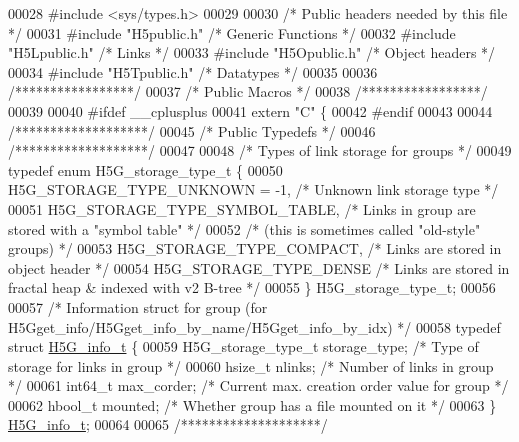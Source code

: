 \begin{DoxyCode}
00028 \textcolor{preprocessor}{#include <sys/types.h>}
00029 
00030 \textcolor{comment}{/* Public headers needed by this file */}
00031 \textcolor{preprocessor}{#include "H5public.h"}       \textcolor{comment}{/* Generic Functions            */}
00032 \textcolor{preprocessor}{#include "H5Lpublic.h"}      \textcolor{comment}{/* Links                                */}
00033 \textcolor{preprocessor}{#include "H5Opublic.h"}      \textcolor{comment}{/* Object headers           */}
00034 \textcolor{preprocessor}{#include "H5Tpublic.h"}      \textcolor{comment}{/* Datatypes                */}
00035 
00036 \textcolor{comment}{/*****************/}
00037 \textcolor{comment}{/* Public Macros */}
00038 \textcolor{comment}{/*****************/}
00039 
00040 \textcolor{preprocessor}{#ifdef \_\_cplusplus}
00041 \textcolor{keyword}{extern} \textcolor{stringliteral}{"C"} \{
00042 \textcolor{preprocessor}{#endif}
00043 
00044 \textcolor{comment}{/*******************/}
00045 \textcolor{comment}{/* Public Typedefs */}
00046 \textcolor{comment}{/*******************/}
00047 
00048 \textcolor{comment}{/* Types of link storage for groups */}
00049 \textcolor{keyword}{typedef} \textcolor{keyword}{enum} H5G\_storage\_type\_t \{
00050     H5G\_STORAGE\_TYPE\_UNKNOWN = -1,  \textcolor{comment}{/* Unknown link storage type    */}
00051     H5G\_STORAGE\_TYPE\_SYMBOL\_TABLE,      \textcolor{comment}{/* Links in group are stored with a "symbol table" */}
00052                                         \textcolor{comment}{/* (this is sometimes called "old-style" groups) */}
00053     H5G\_STORAGE\_TYPE\_COMPACT,       \textcolor{comment}{/* Links are stored in object header */}
00054     H5G\_STORAGE\_TYPE\_DENSE      \textcolor{comment}{/* Links are stored in fractal heap & indexed with v2 B-tree */}
00055 \} H5G\_storage\_type\_t;
00056 
00057 \textcolor{comment}{/* Information struct for group (for H5Gget\_info/H5Gget\_info\_by\_name/H5Gget\_info\_by\_idx) */}
00058 \textcolor{keyword}{typedef} \textcolor{keyword}{struct }\hyperlink{struct_h5_g__info__t}{H5G\_info\_t} \{
00059     H5G\_storage\_type\_t  storage\_type;   \textcolor{comment}{/* Type of storage for links in group */}
00060     hsize\_t     nlinks;             \textcolor{comment}{/* Number of links in group */}
00061     int64\_t     max\_corder;             \textcolor{comment}{/* Current max. creation order value for group */}
00062     hbool\_t     mounted;                \textcolor{comment}{/* Whether group has a file mounted on it */}
00063 \} \hyperlink{struct_h5_g__info__t}{H5G\_info\_t};
00064 
00065 \textcolor{comment}{/********************/}

\end{DoxyCode}
